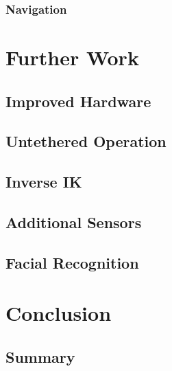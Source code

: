 \documentclass{l4proj}
\begin{document}
\subsection{Navigation}


\chapter{Further Work}


\section{Improved Hardware}
\section{Untethered Operation}
\section{Inverse IK}
\section{Additional Sensors}
\section{Facial Recognition}


\chapter{Conclusion}


\section{Summary}





\end{document}
